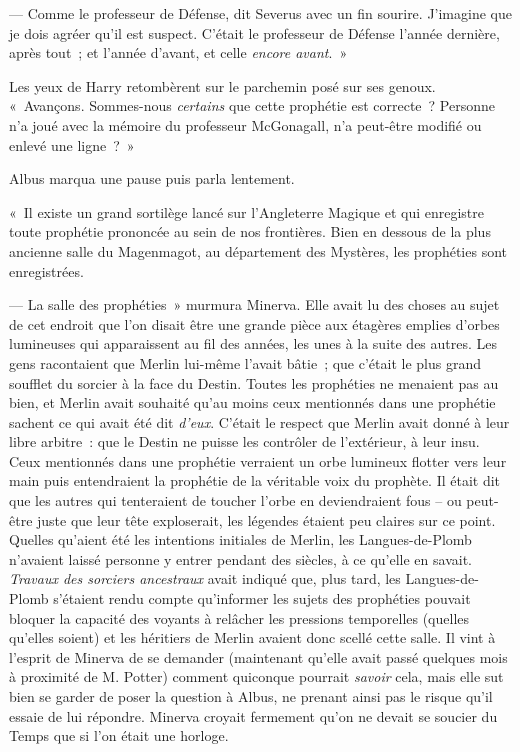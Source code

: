 --- Comme le professeur de Défense, dit Severus avec un fin sourire. J'imagine que je dois agréer qu'il est suspect. C'était le professeur de Défense l'année dernière, après tout~; et l'année d'avant, et celle \emph{encore avant}.~»

Les yeux de Harry retombèrent sur le parchemin posé sur ses genoux. «~Avançons. Sommes-nous \emph{certains} que cette prophétie est correcte~? Personne n'a joué avec la mémoire du professeur McGonagall, n'a peut-être modifié ou enlevé une ligne~?~»

Albus marqua une pause puis parla lentement.

«~Il existe un grand sortilège lancé sur l'Angleterre Magique et qui enregistre toute prophétie prononcée au sein de nos frontières. Bien en dessous de la plus ancienne salle du Magenmagot, au département des Mystères, les prophéties sont enregistrées.

--- La salle des prophéties~» murmura Minerva. Elle avait lu des choses au sujet de cet endroit que l'on disait être une grande pièce aux étagères emplies d'orbes lumineuses qui apparaissent au fil des années, les unes à la suite des autres. Les gens racontaient que Merlin lui-même l'avait bâtie~; que c'était le plus grand soufflet du sorcier à la face du Destin. Toutes les prophéties ne menaient pas au bien, et Merlin avait souhaité qu'au moins ceux mentionnés dans une prophétie sachent ce qui avait été dit \emph{d'eux}. C'était le respect que Merlin avait donné à leur libre arbitre~: que le Destin ne puisse les contrôler de l'extérieur, à leur insu. Ceux mentionnés dans une prophétie verraient un orbe lumineux flotter vers leur main puis entendraient la prophétie de la véritable voix du prophète. Il était dit que les autres qui tenteraient de toucher l'orbe en deviendraient fous -- ou peut-être juste que leur tête exploserait, les légendes étaient peu claires sur ce point. Quelles qu'aient été les intentions initiales de Merlin, les Langues-de-Plomb n'avaient laissé personne y entrer pendant des siècles, à ce qu'elle en savait. \emph{Travaux des sorciers ancestraux} avait indiqué que, plus tard, les Langues-de-Plomb s'étaient rendu compte qu'informer les sujets des prophéties pouvait bloquer la capacité des voyants à relâcher les pressions temporelles (quelles qu'elles soient) et les héritiers de Merlin avaient donc scellé cette salle. Il vint à l'esprit de Minerva de se demander (maintenant qu'elle avait passé quelques mois à proximité de M. Potter) comment quiconque pourrait \emph{savoir} cela, mais elle sut bien se garder de poser la question à Albus, ne prenant ainsi pas le risque qu'il essaie de lui répondre. Minerva croyait fermement qu'on ne devait se soucier du Temps que si l'on était une horloge.

